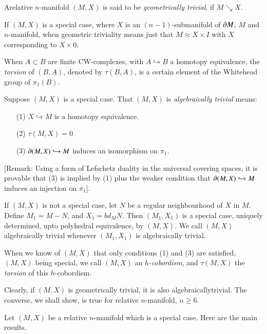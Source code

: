 \begin{definition}\label{chap8-defi8.3.1}
A\pageoriginale relative $n$-manifold $(M,X)$ is said to be {\em geometrically trivial}, if $M\searrow X$.
\end{definition}

If $(M,X)$ is a special case, where $X$ is an $(n-1)$-submanifold of $\partial M$, $M$ and $n$-manifold, when geometric triviality means just that $M\approx X\times I$ with $X$ corresponding to $X\times 0$.

When $A\subset B$ are finite CW-complexes, with $A\hookrightarrow B$ a homotopy equivalence, the {\em torsion} of $(B,A)$, denoted by $\tau(B,A)$, is a certain element of the Whitehead group of $\pi_{1}(B)$.

\begin{definition}\label{chap8-defi8.3.2}
Suppose $(M,X)$ is a special case. That $(M,X)$ is {\em algebraically trivial} means:
\begin{itemize}
\item[(1)] $X\hookrightarrow M$ is a homotopy equivalence.

\item[(2)] $\tau (M,X)=0$

\item[(3)] $\partial (M,X)\hookrightarrow M$ induces an isomorphism on $\pi_{1}$.
\end{itemize}
\end{definition}

[Remark: Using a form of Lefschetz duality in the universal covering spaces, it is provable that (3) is implied by (1) plus the weaker condition that $\partial (M,X)\hookrightarrow M$ induces an injection on $\pi_{1}$].

If $(M,X)$ is not a special case, let $N$ be a regular neighbourhood of $X$ in $M$. Define $M_{1}=M-N$, and $X_{1}=bd_{M}N$. Then $(M_{1},X_{1})$ is a special case, uniquely determined, upto polyhedral equivalence, by $(M,X)$. We call $(M,X)$ algebraically trivial whenever $(M_{1},X_{1})$ is algebraically trivial.

When we know of $(M,X)$ that only conditions (1) and (3) are satisfied, $(M,X)$ being special, we call $(M,X)$ an {\em $h$-cobordism}, and $\tau(M,X)$ the {\em torsion} of this $h$-cobordism.

Clearly, if $(M,X)$ is geometrically trivial, it is also algebraically\pageoriginale trivial. The converse, we shall show, is true for relative $n$-manifold, $n\geq 6$.

Let $(M,X)$ be a relative $n$-manifold which is a special case. Here are the main results.

